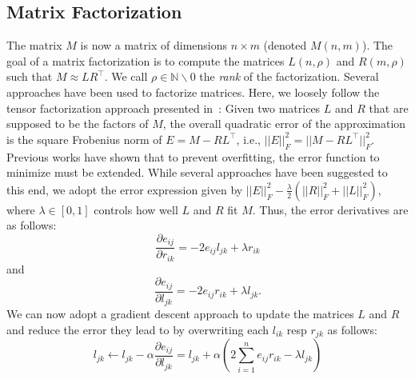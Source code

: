 \documentclass{llncs}
\begin{document}
\subsection{Matrix Factorization}
The matrix $M$ is now a matrix of dimensions $n \times m$ (denoted $M(n,m)$). 
The goal of a matrix factorization is to compute the matrices $L(n, \rho)$ and $R(m, \rho)$ such that $M \approx LR^{\top}$.
We call $\rho \in \mathbb{N} \backslash {0}$ the \emph{rank} of the factorization.
Several approaches have been used to factorize matrices.
Here, we loosely follow the tensor factorization approach presented in~\cite{DBLP:conf/www/NickelTK12}: Given two matrices $L$ and $R$ that are supposed to be the factors of $M$, the overall quadratic error of the approximation is the square Frobenius norm of $E = M - RL^{\top}$, i.e., $||E||_F^2 = ||M - RL^{\top}||_F^2$.
Previous works have shown that to prevent overfitting, the error function to minimize must be extended.
While several approaches have been suggested to this end, we adopt the error expression given by $||E||_F^2 - \frac{\lambda}{2}(||R||_F^2 + ||L||_F^2)$, where $\lambda \in [0, 1]$ controls how well $L$ and $R$ fit $M$. 
Thus, the error derivatives are as follows:
\begin{equation}
\frac{\partial e_{ij}}{\partial r_{ik}} = -2 e_{ij}l_{jk} + \lambda r_{ik}  
\end{equation}
 and 
\begin{equation}
\frac{\partial e_{ij}}{\partial l_{jk}} = -2 e_{ij}r_{ik} + \lambda l_{jk}.  
\end{equation}
We can now adopt a gradient descent approach to update the matrices $L$ and $R$ and reduce the error they lead to by overwriting each $l_{ik}$ resp $r_{jk}$ as follows:
\begin{equation}
l_{jk} \leftarrow l_{jk} - \alpha \frac{\partial e_{ij}}{\partial l_{jk}} = l_{jk} + \alpha \left(2 \sum\limits_{i=1}^n e_{ij}r_{ik} - \lambda l_{jk} \right)
\end{equation}
\end{document}
